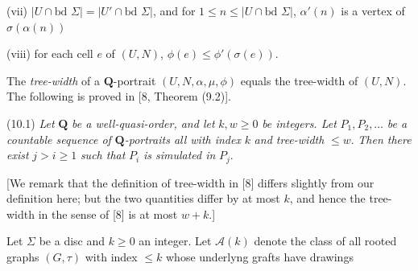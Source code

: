 \hspace*{12pt}(vii) $|U \cap \text{bd } \Sigma| = |U' \cap \text{bd } \Sigma|$, and for $1 \le n \le |U \cap \text{bd } \Sigma|$, $\alpha'(n)$ is a vertex of $\sigma(\alpha(n))$

\hspace*{12pt}(viii) for each cell $e$ of $(U, N)$, $\phi(e) \le \phi'(\sigma(e))$.

The \textit{tree-width} of a $\mathbf{Q}$-portrait $(U, N, \alpha, \mu, \phi)$ equals the tree-width of $(U, N)$. The following is proved in [8, Theorem (9.2)].

\stmt
(10.1) \textit{Let} $\mathbf{Q}$ \textit{be a well-quasi-order, and let} $k, w \ge 0$ \textit{be integers. Let} $P_1, P_2, \dots$ \textit{be a countable sequence of} $\mathbf{Q}$\textit{-portraits all with index} $k$ \textit{and tree-width} $\le w$. \textit{Then there exist} $j > i \ge 1$ \textit{such that} $P_i$ \textit{is simulated in} $P_j$.

[We remark that the definition of tree-width in [8] differs slightly from our definition here; but the two quantities differ by at most $k$, and hence the tree-width in the sense of [8] is at most $w + k$.]


Let $\Sigma$ be a disc and $k \ge 0$ an integer. Let $\mathscr{A}(k)$ denote the class of all rooted graphs $(G, \tau)$ with index $\le k$ whose underlyng grafts have drawings

